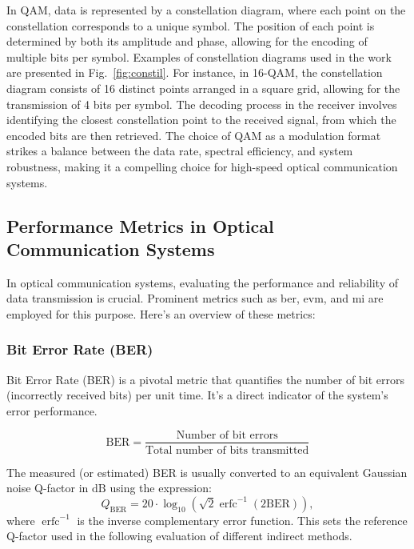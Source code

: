 In QAM, data is represented by a constellation diagram, where each point on the constellation corresponds to a unique symbol. The position of each point is determined by both its amplitude and phase, allowing for the encoding of multiple bits per symbol. Examples of constellation diagrams used in the work are presented in Fig.~\ref{fig:constil}. For instance, in 16-QAM, the constellation diagram consists of 16 distinct points arranged in a square grid, allowing for the transmission of 4 bits per symbol. The decoding process in the receiver involves identifying the closest constellation point to the received signal, from which the encoded bits are then retrieved. The choice of QAM as a modulation format strikes a balance between the data rate, spectral efficiency, and system robustness, making it a compelling choice for high-speed optical communication systems.

\subsection{Performance Metrics in Optical Communication Systems}


In optical communication systems, evaluating the performance and reliability of data transmission is crucial. Prominent metrics such as \gls{ber}, \gls{evm}, and \gls{mi} are employed for this purpose. Here's an overview of these metrics:

\subsubsection{Bit Error Rate (BER)}
Bit Error Rate (BER) is a pivotal metric that quantifies the number of bit errors (incorrectly received bits) per unit time. It's a direct indicator of the system's error performance.

\begin{equation}
\text{BER} = \frac{\text{Number of bit errors}}{\text{Total number of bits transmitted}}
\end{equation}

The measured (or estimated) BER is usually converted to an equivalent Gaussian noise Q-factor in $\mathrm{dB}$ using the expression:
\begin{equation}
Q_{\mathrm{BER}}=20 \cdot \log _{10}\left(\sqrt{2} \operatorname{erfc}^{-1}(2 \mathrm{BER})\right),
\end{equation}
where $\operatorname{erfc}^{-1}$ is the inverse complementary error function. This sets the reference Q-factor used in the following evaluation of different indirect methods.

